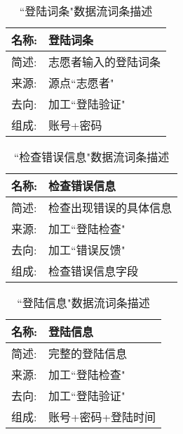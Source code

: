 \begin{table}[H]  
\caption{``登陆词条"数据流词条描述}  
\begin{center}  
    \begin{tabular}{l p{11cm}} 
        \hline
        \quad 名称:  &   登陆词条 \\
        \hline
        \quad 简述:  & 志愿者输入的登陆词条 \\
        \hline
        \quad 来源:  & 源点``志愿者" \\
        \hline
        \quad 去向:  & 加工``登陆验证" \\
        \hline
        \quad 组成:  & 账号+密码 \\
        \hline
    \end{tabular}
    \label{tab1}
\end{center}
\end{table}

\begin{table}[H]  
\caption{``检查错误信息"数据流词条描述}  
\begin{center}  
    \begin{tabular}{l p{11cm}} 
        \hline
        \quad 名称:  &   检查错误信息 \\
        \hline
        \quad 简述:  & 检查出现错误的具体信息 \\
        \hline
        \quad 来源:  & 加工``登陆检查" \\
        \hline
        \quad 去向:  & 加工``错误反馈" \\
        \hline
        \quad 组成:  & 检查错误信息字段\\
        \hline
    \end{tabular}
    \label{tab1}
\end{center}
\end{table}

\begin{table}[H]  
\caption{``登陆信息"数据流词条描述}  
\begin{center}  
    \begin{tabular}{l p{11cm}} 
        \hline
        \quad 名称:  &  登陆信息 \\
        \hline
        \quad 简述:  & 完整的登陆信息 \\
        \hline
        \quad 来源:  & 加工``登陆检查" \\
        \hline
        \quad 去向:  & 加工``登陆验证" \\
        \hline
        \quad 组成:  & 账号+密码+登陆时间 \\
        \hline
    \end{tabular}
    \label{tab1}
\end{center}
\end{table}

